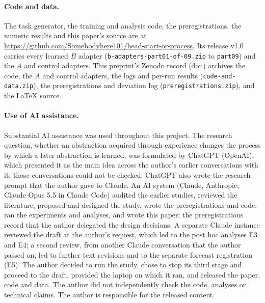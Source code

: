 \documentclass[11pt]{article}
\begin{document}
\paragraph{Code and data.} The task generator, the training and analysis code, the preregistrations, the numeric results and this paper's source are at \url{https://github.com/Somebodyhere101/head-start-or-process}. Its release v1.0 carries every learned $B$ adapter (\texttt{b-adapters-part01-of-09.zip} to \texttt{part09}) and the $A$ and control adapters. This preprint's Zenodo record (doi:\recorddoi) archives the code, the $A$ and control adapters, the logs and per-run results (\texttt{code-and-data.zip}), the preregistrations and deviation log (\texttt{preregistrations.zip}), and the \LaTeX{} source.
\paragraph{Use of AI assistance.} Substantial AI assistance was used throughout this project. The research question, whether an abstraction acquired through experience changes the process by which a later abstraction is learned, was formulated by ChatGPT (OpenAI), which presented it as the main idea across the author's earlier conversations with it; those conversations could not be checked. ChatGPT also wrote the research prompt that the author gave to Claude. An AI system (Claude, Anthropic; Claude Opus 5.5 in Claude Code) audited the earlier studies, reviewed the literature, proposed and designed the study, wrote the preregistrations and code, ran the experiments and analyses, and wrote this paper; the preregistrations record that the author delegated the design decisions. A separate Claude instance reviewed the draft at the author's request, which led to the post hoc analyses E3 and E4; a second review, from another Claude conversation that the author passed on, led to further text revisions and to the separate forecast registration (E5). The author decided to run the study, chose to stop its third stage and proceed to the draft, provided the laptop on which it ran, and released the paper, code and data. The author did not independently check the code, analyses or technical claims. The author is responsible for the released content.
\end{document}
